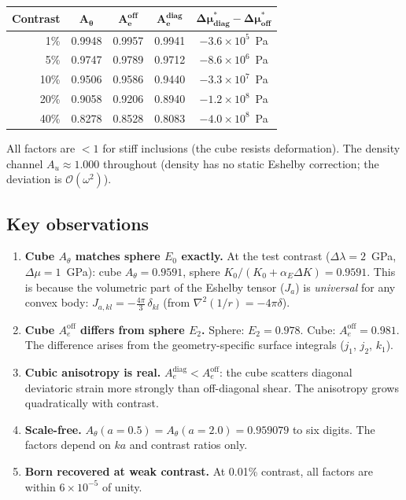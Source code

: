 \documentclass[11pt,a4paper]{article}
\newcommand{\D}{\Delta}
\newcommand{\order}{\mathcal{O}}
\begin{document}
\begin{center}
\begin{tabular}{rcccc}
\toprule
\textbf{Contrast} & $\bm{A_\theta}$ & $\bm{A_e^{\textbf{off}}}$
  & $\bm{A_e^{\textbf{diag}}}$
  & $\bm{\D\mu^*_{\textbf{diag}} - \D\mu^*_{\textbf{off}}}$ \\
\midrule
  1\% & 0.9948 & 0.9957 & 0.9941 & $-3.6 \times 10^5$~Pa\\
  5\% & 0.9747 & 0.9789 & 0.9712 & $-8.6 \times 10^6$~Pa\\
 10\% & 0.9506 & 0.9586 & 0.9440 & $-3.3 \times 10^7$~Pa\\
 20\% & 0.9058 & 0.9206 & 0.8940 & $-1.2 \times 10^8$~Pa\\
 40\% & 0.8278 & 0.8528 & 0.8083 & $-4.0 \times 10^8$~Pa\\
\bottomrule
\end{tabular}
\end{center}

All factors are $< 1$ for stiff inclusions (the cube resists
deformation).  The density channel $A_u \approx 1.000$ throughout
(density has no static Eshelby correction; the deviation is
$\order(\omega^2)$).

\subsection{Key observations}

\begin{enumerate}[label=(\roman*)]

\item \textbf{Cube $A_\theta$ matches sphere $E_0$ exactly.}
At the test contrast ($\D\lambda = 2$~GPa, $\D\mu = 1$~GPa):
cube $A_\theta = 0.9591$, sphere
$K_0/(K_0 + \alpha_E \D K) = 0.9591$.  This is because the
volumetric part of the Eshelby tensor ($J_a$) is
\emph{universal} for any convex body:
$J_{a,kl} = -\tfrac{4\pi}{3}\,\delta_{kl}$
(from $\nabla^2(1/r) = -4\pi\delta$).

\item \textbf{Cube $A_e^{\text{off}}$ differs from sphere $E_2$.}
Sphere: $E_2 = 0.978$.  Cube: $A_e^{\text{off}} = 0.981$.
The difference arises from the geometry-specific surface integrals
($j_1$, $j_2$, $k_1$).

\item \textbf{Cubic anisotropy is real.}
$A_e^{\text{diag}} < A_e^{\text{off}}$: the cube scatters
diagonal deviatoric strain more strongly than off-diagonal shear.
The anisotropy grows quadratically with contrast.

\item \textbf{Scale-free.}
$A_\theta(a{=}0.5) = A_\theta(a{=}2.0) = 0.959079$ to six digits.
The factors depend on $ka$ and contrast ratios only.

\item \textbf{Born recovered at weak contrast.}  At 0.01\% contrast,
all factors are within $6 \times 10^{-5}$ of unity.

\end{enumerate}
\end{document}
